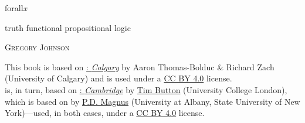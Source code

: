 

\pagestyle{empty}

\vspace*{80pt}

\begin{raggedleft}
\fontsize{34pt}{24pt}\sffamily
\selectfont
{forall\hspace{.08em}\fontsize{36pt}{24pt}\selectfont\rmfamily\textit{x}}

\smallskip\fontsize{16pt}{20pt}\sffamily\selectfont
\textcolor{maroon}{\uppercase{}}  

\bigskip\fontsize{16pt}{20pt}\selectfont

truth functional propositional logic

\vspace*{50pt}
\fontsize{10pt}{16pt}\selectfont
\textsc{Gregory Johnson}

\vfill
\textcolor{maroon}{\forallxversion}\par
\end{raggedleft}


\newpage 


\noindent \small This book is based on \href{http://forallx.openlogicproject.org/}{\forallx:\emph{ Calgary}} by {Aaron Thomas-Bolduc \& Richard Zach} ({University of Calgary}) and is used under a \href{https://creativecommons.org/licenses/by/4.0/}{CC BY 4.0} license.\\[1ex] 

 is, in turn, based on \href{http://www.homepages.ucl.ac.uk/~uctytbu/OERs.html}{\forallx:\emph{ Cambridge}} by \href{http://www.homepages.ucl.ac.uk/~uctytbu/}{Tim Button} ({University College London}), 
which is based on \href{https://www.fecundity.com/logic/}{\forallx} by \href{https://www.fecundity.com/job/}{P.D. Magnus} (University at Albany, State University of New York)---used, in both cases, under a \href{https://creativecommons.org/licenses/by/4.0/}{CC BY 4.0} license.\\[1ex]


